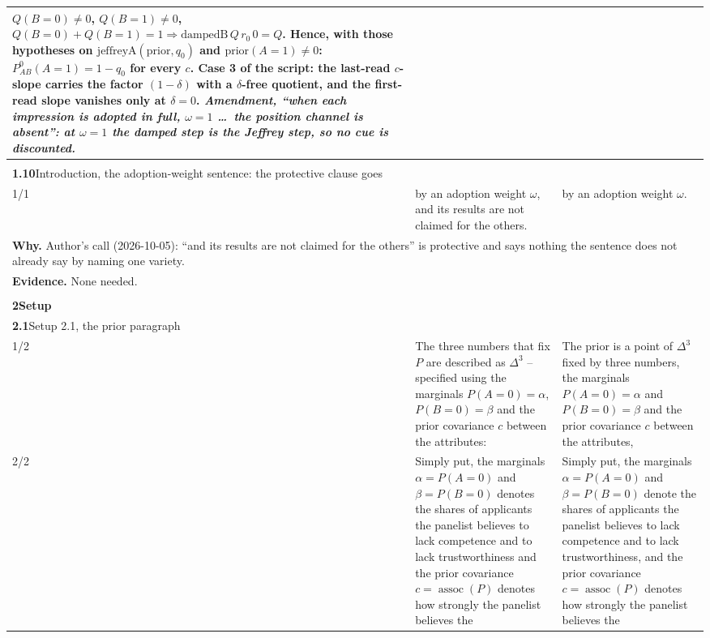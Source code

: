 \documentclass[10pt]{article}
\theoremstyle{definition}
\newcommand{\assoc}{\operatorname{assoc}}
\newlength{\fullw}\setlength{\fullw}{25.9cm}
\newcommand{\entryhead}[2]{\multicolumn{3}{|l|}{\rule{0pt}{2.6ex}\large\textbf{#1}\quad #2} \\ \hline}
\begin{document}
{\begin{longtable}{|p{0.9cm}|p{12.2cm}|p{12.2cm}|}
{$Q(B{=}0)\neq0$, $Q(B{=}1)\neq0$, $Q(B{=}0)+Q(B{=}1)=1\Rightarrow\mathrm{dampedB}\,Q\,r_0\,0=Q$.
Hence, with those hypotheses on $\mathrm{jeffreyA}(\mathrm{prior},q_0)$ and
$\mathrm{prior}(A{=}1)\neq0$: $P^{0}_{AB}(A{=}1)=1-q_0$ for every $c$. Case 3 of the
script: the last-read $c$-slope carries the factor $(1-\delta)$ with a $\delta$-free
quotient, and the first-read slope vanishes only at $\delta=0$. \newline \textit{Amendment, ``when each impression is adopted in full, $\omega=1$ \ldots\ the position channel is absent'': at $\omega=1$ the damped step is the Jeffrey step, so no cue is discounted.}} \\ \hline
\multicolumn{3}{|l|}{} \\ \hline
\entryhead{1.10}{Introduction, the adoption-weight sentence: the protective clause goes\quad{\footnotesize\textit{(formerly C.30)}}}
1/1 & by an adoption weight $\omega$, and its results are not claimed for the others. & by an adoption weight $\omega$. \\ \hline
\multicolumn{3}{|p{\fullw}|}{\textbf{Why.} Author's call (2026-10-05): ``and its results are not claimed for the others'' is protective and says nothing the sentence does not already say by naming one variety.} \\
\multicolumn{3}{|p{\fullw}|}{\textbf{Evidence.} None needed.} \\ \hline
\multicolumn{3}{|l|}{} \\ \hline
\multicolumn{3}{|l|}{\rule{0pt}{3.2ex}\Large\textbf{2\quad Setup}} \\ \hline\hline
\entryhead{2.1}{Setup 2.1, the prior paragraph\quad{\footnotesize\textit{(formerly C.9)}}}
1/2 & The three numbers that fix $P$ are described as $\Delta^{3}$ -- specified using the marginals $P(A{=}0)=\alpha$, $P(B{=}0)=\beta$ and the prior covariance $c$ between the attributes: & The prior is a point of $\Delta^{3}$ fixed by three numbers, the marginals $P(A{=}0)=\alpha$ and $P(B{=}0)=\beta$ and the prior covariance $c$ between the attributes, \\ \hline
2/2 & Simply put, the marginals $\alpha=P(A{=}0)$ and $\beta=P(B{=}0)$ denotes the shares of applicants the panelist believes to lack competence and to lack trustworthiness and the prior covariance $c=\assoc(P)$ denotes how strongly the panelist believes the & Simply put, the marginals $\alpha=P(A{=}0)$ and $\beta=P(B{=}0)$ denote the shares of applicants the panelist believes to lack competence and to lack trustworthiness, and the prior covariance $c=\assoc(P)$ denotes how strongly the panelist believes the \\ \hline

\end{longtable}}
\end{document}
